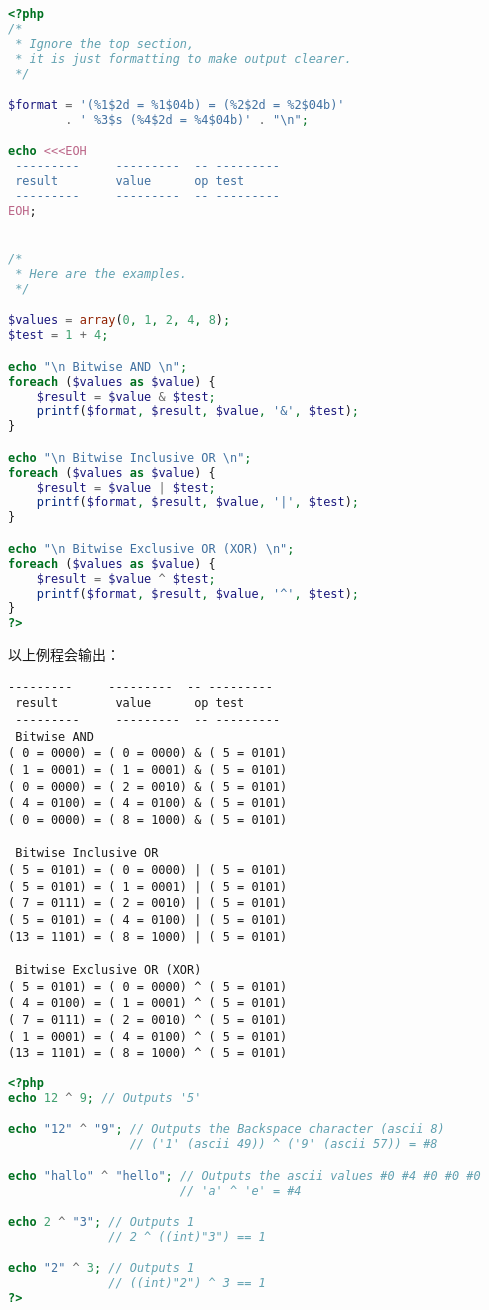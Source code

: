 \begin{lstlisting}[language=PHP]
<?php
/*
 * Ignore the top section,
 * it is just formatting to make output clearer.
 */

$format = '(%1$2d = %1$04b) = (%2$2d = %2$04b)'
        . ' %3$s (%4$2d = %4$04b)' . "\n";

echo <<<EOH
 ---------     ---------  -- ---------
 result        value      op test
 ---------     ---------  -- ---------
EOH;


/*
 * Here are the examples.
 */

$values = array(0, 1, 2, 4, 8);
$test = 1 + 4;

echo "\n Bitwise AND \n";
foreach ($values as $value) {
    $result = $value & $test;
    printf($format, $result, $value, '&', $test);
}

echo "\n Bitwise Inclusive OR \n";
foreach ($values as $value) {
    $result = $value | $test;
    printf($format, $result, $value, '|', $test);
}

echo "\n Bitwise Exclusive OR (XOR) \n";
foreach ($values as $value) {
    $result = $value ^ $test;
    printf($format, $result, $value, '^', $test);
}
?>
\end{lstlisting}


以上例程会输出：

\begin{verbatim}
---------     ---------  -- ---------
 result        value      op test
 ---------     ---------  -- ---------
 Bitwise AND
( 0 = 0000) = ( 0 = 0000) & ( 5 = 0101)
( 1 = 0001) = ( 1 = 0001) & ( 5 = 0101)
( 0 = 0000) = ( 2 = 0010) & ( 5 = 0101)
( 4 = 0100) = ( 4 = 0100) & ( 5 = 0101)
( 0 = 0000) = ( 8 = 1000) & ( 5 = 0101)

 Bitwise Inclusive OR
( 5 = 0101) = ( 0 = 0000) | ( 5 = 0101)
( 5 = 0101) = ( 1 = 0001) | ( 5 = 0101)
( 7 = 0111) = ( 2 = 0010) | ( 5 = 0101)
( 5 = 0101) = ( 4 = 0100) | ( 5 = 0101)
(13 = 1101) = ( 8 = 1000) | ( 5 = 0101)

 Bitwise Exclusive OR (XOR)
( 5 = 0101) = ( 0 = 0000) ^ ( 5 = 0101)
( 4 = 0100) = ( 1 = 0001) ^ ( 5 = 0101)
( 7 = 0111) = ( 2 = 0010) ^ ( 5 = 0101)
( 1 = 0001) = ( 4 = 0100) ^ ( 5 = 0101)
(13 = 1101) = ( 8 = 1000) ^ ( 5 = 0101)
\end{verbatim}


\begin{lstlisting}[language=PHP]
<?php
echo 12 ^ 9; // Outputs '5'

echo "12" ^ "9"; // Outputs the Backspace character (ascii 8)
                 // ('1' (ascii 49)) ^ ('9' (ascii 57)) = #8

echo "hallo" ^ "hello"; // Outputs the ascii values #0 #4 #0 #0 #0
                        // 'a' ^ 'e' = #4

echo 2 ^ "3"; // Outputs 1
              // 2 ^ ((int)"3") == 1

echo "2" ^ 3; // Outputs 1
              // ((int)"2") ^ 3 == 1
?>
\end{lstlisting}





